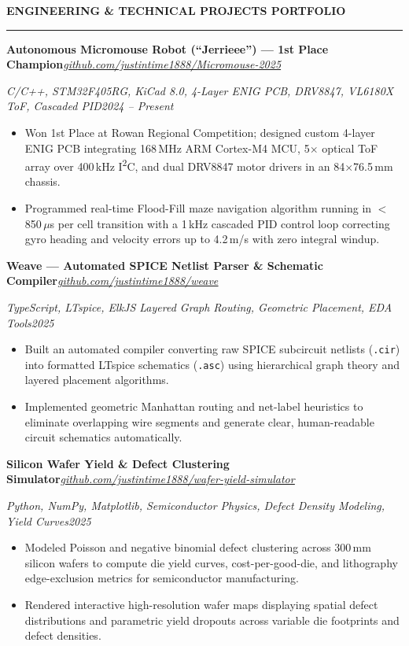 \documentclass[10pt]{article}
\newcommand{\ulink}[2]{\href{#1}{\underline{#2}}}
\newcommand{\Section}[1]{%
  \vspace{4.5pt}%
  \textbf{\MakeUppercase{#1}}\par\vspace{-3.5pt}%
  \rule{\linewidth}{0.55pt}\par\vspace{2.5pt}%
}
\newcommand{\RoleDates}[2]{\noindent\textit{#1}\hfill\textit{#2}\par}
\newcommand{\ProjectHeading}[2]{\noindent\textbf{#1}\hfill\textit{#2}\par}
\begin{document}
\newpage

\Section{Engineering \& Technical Projects Portfolio}

\ProjectHeading{Autonomous Micromouse Robot (``Jerrieee'') --- 1st Place Champion}{\ulink{https://github.com/justintime1888/Micromouse-2025}{github.com/justintime1888/Micromouse-2025}}
\RoleDates{C/C++, STM32F405RG, KiCad 8.0, 4-Layer ENIG PCB, DRV8847, VL6180X ToF, Cascaded PID}{2024 -- Present}
\begin{itemize}
  \item Won 1st Place at Rowan Regional Competition; designed custom 4-layer ENIG PCB integrating 168\,MHz ARM Cortex-M4 MCU, 5$\times$ optical ToF array over 400\,kHz I\textsuperscript{2}C, and dual DRV8847 motor drivers in an 84$\times$76.5\,mm chassis.
  \item Programmed real-time Flood-Fill maze navigation algorithm running in $<$850\,$\mu$s per cell transition with a 1\,kHz cascaded PID control loop correcting gyro heading and velocity errors up to 4.2\,m/s with zero integral windup.
\end{itemize}

\vspace{3.5pt}
\ProjectHeading{Weave --- Automated SPICE Netlist Parser \& Schematic Compiler}{\ulink{https://github.com/justintime1888/weave}{github.com/justintime1888/weave}}
\RoleDates{TypeScript, LTspice, ElkJS Layered Graph Routing, Geometric Placement, EDA Tools}{2025}
\begin{itemize}
  \item Built an automated compiler converting raw SPICE subcircuit netlists (\texttt{.cir}) into formatted LTspice schematics (\texttt{.asc}) using hierarchical graph theory and layered placement algorithms.
  \item Implemented geometric Manhattan routing and net-label heuristics to eliminate overlapping wire segments and generate clear, human-readable circuit schematics automatically.
\end{itemize}

\vspace{3.5pt}
\ProjectHeading{Silicon Wafer Yield \& Defect Clustering Simulator}{\ulink{https://github.com/justintime1888/wafer-yield-simulator}{github.com/justintime1888/wafer-yield-simulator}}
\RoleDates{Python, NumPy, Matplotlib, Semiconductor Physics, Defect Density Modeling, Yield Curves}{2025}
\begin{itemize}
  \item Modeled Poisson and negative binomial defect clustering across 300\,mm silicon wafers to compute die yield curves, cost-per-good-die, and lithography edge-exclusion metrics for semiconductor manufacturing.
  \item Rendered interactive high-resolution wafer maps displaying spatial defect distributions and parametric yield dropouts across variable die footprints and defect densities.
\end{itemize}
\end{document}
